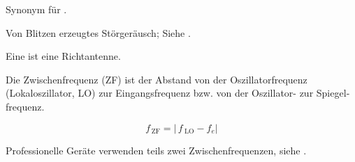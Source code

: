 {}

{Synonym für .}

{Von Blitzen erzeugtes Störgeräusch; Siehe .}

{Eine  ist eine Richtantenne.}

{Die Zwischenfrequenz (ZF) ist der Abstand von der Oszillatorfrequenz (Lokaloszillator, LO) zur Eingangsfrequenz bzw. von der Oszillator- zur Spiegel­fre­quenz.

\[ f_\mathrm{\,ZF} = \left|\, f_\mathrm{\:LO} - f_e \right| \]

Professionelle Geräte verwenden teils zwei Zwischenfrequenzen, siehe .
}